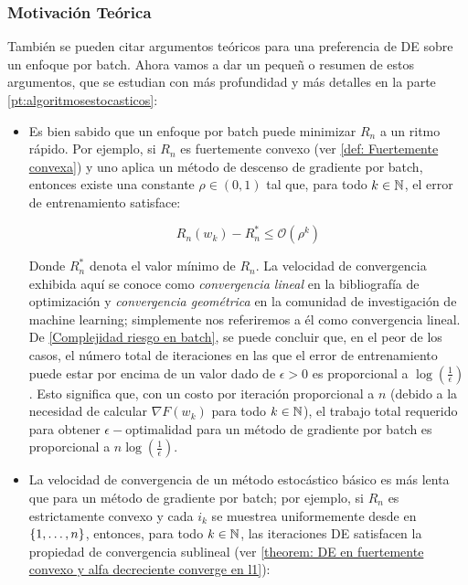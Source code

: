 \subsubsection{Motivación Teórica }

También se pueden citar argumentos teóricos para una preferencia de DE sobre un enfoque por batch. Ahora vamos a dar un peque\~n o resumen de estos argumentos, que se estudian con m\'as profundidad y m\'as detalles en la parte \ref{pt:algoritmosestocasticos}:

\begin{itemize}
	\item Es bien sabido que un enfoque por batch puede minimizar $R_n$ a un ritmo r\'apido. Por ejemplo, si $R_n$ es fuertemente convexo (ver \ref{def: Fuertemente convexa}) y uno aplica un m\'etodo de descenso de gradiente por batch, entonces existe una constante $\rho \in (0,1)$ tal que, para todo $k \in {\mathbb{N}}$, el error de entrenamiento satisface:
	
	\begin{equation}
	\label{Complejidad riesgo en batch}
	R_n(w_k) - R_n^* \leq \mathcal{O} \left(\rho^k\right)
	\end{equation}
	
	Donde $R_n^*$ denota el valor m\'inimo de $R_n$. La velocidad de convergencia exhibida aquí se conoce como \textit{convergencia lineal} en la bibliograf\'ia de optimización \cite{ortega:2000} y \textit{convergencia geométrica} en la comunidad de investigación de machine learning; simplemente nos referiremos a él como convergencia lineal. De \ref{Complejidad riesgo en batch}, se puede concluir que, en el peor de los casos, el número total de iteraciones en las que el error de entrenamiento puede estar por encima de un valor dado de $\epsilon >0$ es proporcional a $\log \left(\frac{1}{\epsilon}\right)$. Esto significa que, con un costo por iteración proporcional a $n$ (debido a la necesidad de calcular $\nabla F(w_k)$ para todo $k \in {\mathbb{N}}$), el trabajo total requerido para obtener $\epsilon-$optimalidad para un método de gradiente por batch es proporcional a $n \log\left(\frac{1}{\epsilon}\right)$.
	
	\item La velocidad de convergencia de un método estocástico básico es más lenta que para un método de gradiente por batch; por ejemplo, si $R_n$ es estrictamente convexo y cada $i_k$ se muestrea uniformemente desde en $\left\lbrace1, \dots, n\right\rbrace$, entonces, para todo $k \in {\mathbb{N}}$, las iteraciones DE satisfacen la propiedad de convergencia sublineal (ver \ref{theorem: DE en fuertemente convexo y alfa decreciente converge en l1}):
	

\end{itemize}
